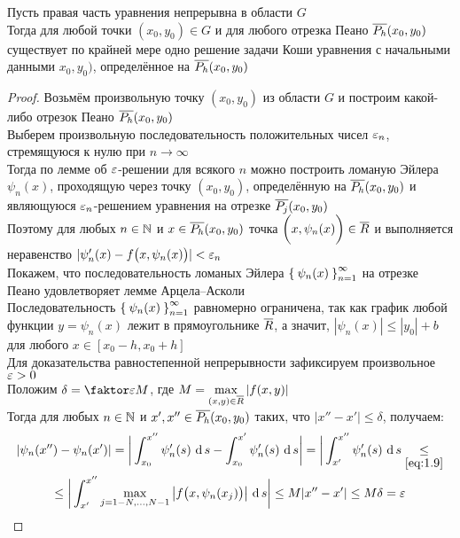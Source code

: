 \begin{theorem}
    Пусть правая часть уравнения  непрерывна в области $ G $ \\
    Тогда для любой точки $ (x_0, y_0) \in G $ и для любого отрезка Пеано $ \overline{P_h}(x_0, y_0) $ существует по крайней мере одно решение задачи Коши уравнения  с начальными данными $ x_0, y_0) $, определённое на $ \overline{P_h}(x_0, y_0) $
\end{theorem}

\begin{proof}
    Возьмём произвольную точку $ (x_0, y_0) $ из области $ G $ и построим какой-либо отрезок Пеано $ \overline{P_h}(x_0, y_0) $ \\
    Выберем произвольную последовательность положительных чисел $ \varepsilon_n $, стремящуюся к нулю при $ n \to \infty $ \\
    Тогда по лемме об $ \varepsilon $-решении для всякого $ n $ можно построить ломаную Эйлера $ \psi_n(x) $, проходящую через точку $ (x_0, y_0) $, определённую на $ \overline{P_h}(x_0, y_0) $ и являющуюся $ \varepsilon_n $-решением уравнения  на отрезке $ \overline{P_j}(x_0, y_0) $ \\
    Поэтому для любых $ n \in \mathbb{N} $ и $ x \in \overline{P_h}(x_0, y_0) $ точка $ \bigg( x, \psi_n(x) \bigg) \in \overline{R} $ и выполняется неравенство  $ |\psi_n'(x) - f \big( x, \psi_n(x) \big) | < \varepsilon_n $ \\
    Покажем, что последовательность ломаных Эйлера $ \Set{\psi_n(x)}_{n=1}^{\infty} $ на отрезке Пеано удовлетворяет лемме Арцела--Асколи \\
    Последовательность $ \Set{\psi_n(x)}_{n=1}^{\infty} $ равномерно ограничена, так как график любой функции $ y = \psi_n(x) $ лежит в прямоугольнике $ \overline{R} $, а значит, $ |\psi_n(x)| \le |y_0| + b $ для любого $ x \in [x_0 - h, x_0 + h] $ \\
    Для доказательства равностепенной непрерывности зафиксируем произвольное $ \varepsilon > 0 $ \\
    Положим $ \delta = \faktor\veps{M} $, где $ M = \max\limits_{(x, y) \in \overline{R}}|f(x, y)| $ \\
    Тогда для любых $ n \in \mathbb{N} $ и $ x', x'' \in \overline{P_h}(x_0, y_0) $ таких, что $ |x'' - x'| \le \delta $, получаем:
    \begin{multline*}
        |\psi_n(x'') - \psi_n(x')| = \bigg| \dint[s]{x_0}{x''}{\psi_n'(s)} - \dint[s]{x_0}{x'}{\psi_n'(s)} \bigg| = \bigg| \dint[s]{x'}{x''}{\psi_n'(s)} \underset{\eref{1.9}}\le \\
        \le \bigg| \dint[s]{x'}{x''}{\max\limits_{j = 1 - N, ..., N - 1} \big| f \big( x, \psi_n(x_j) \big) \big|} \bigg| \le M|x'' - x'| \le M\delta = \veps

\end{multline*}
\end{proof}
